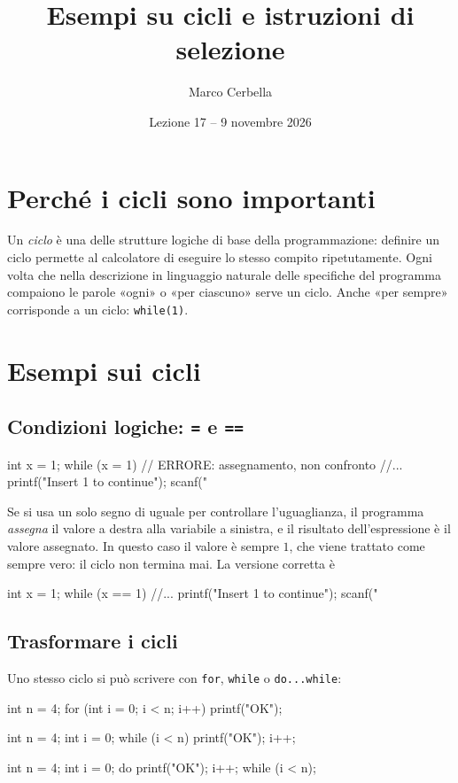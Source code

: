 \documentclass[11pt,a4paper]{article}
\title{Esempi su cicli e istruzioni di selezione}
\author{Marco Cerbella}
\date{Lezione 17 -- 9 novembre 2026}
\begin{document}
\maketitle

\section{Perché i cicli sono importanti}

Un \emph{ciclo} è una delle strutture logiche di base della programmazione: definire un ciclo permette al calcolatore di eseguire lo stesso compito ripetutamente. Ogni volta che nella descrizione in linguaggio naturale delle specifiche del programma compaiono le parole «ogni» o «per ciascuno» serve un ciclo. Anche «per sempre» corrisponde a un ciclo: \lstinline|while(1)|.

\section{Esempi sui cicli}

\subsection{Condizioni logiche: \texttt{=} e \texttt{==}}

\begin{codice}
int x = 1;
while (x = 1) {          // ERRORE: assegnamento, non confronto
    //...
    printf("Insert 1 to continue");
    scanf("%
}
\end{codice}
Se si usa un solo segno di uguale per controllare l'uguaglianza, il programma \emph{assegna} il valore a destra alla variabile a sinistra, e il risultato dell'espressione è il valore assegnato. In questo caso il valore è sempre $1$, che viene trattato come sempre vero: il ciclo non termina mai. La versione corretta è
\begin{codice}
int x = 1;
while (x == 1) {
    //...
    printf("Insert 1 to continue");
    scanf("%
}
\end{codice}

\subsection{Trasformare i cicli}

Uno stesso ciclo si può scrivere con \lstinline|for|, \lstinline|while| o \lstinline|do...while|:
\begin{codice}
int n = 4;
for (int i = 0; i < n; i++) {
    printf("OK\n");
}
\end{codice}
\begin{codice}
int n = 4;
int i = 0;
while (i < n) {
    printf("OK\n");
    i++;
}
\end{codice}
\begin{codice}
int n = 4;
int i = 0;
do {
    printf("OK\n");
    i++;
} while (i < n);
\end{codice}
\end{document}
